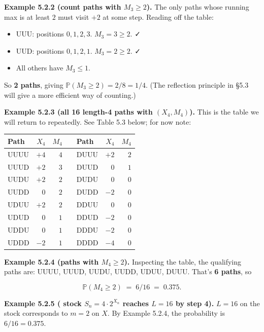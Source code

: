 \documentclass[
  10pt,
  twoside]{book}
\newcounter{none} %
\providecommand{\tightlist}{%
  \setlength{\itemsep}{0pt}\setlength{\parskip}{0pt}}
\begin{document}
\textbf{Example 5.2.2 (count paths with \(M_3 \ge 2\)).} The only paths
whose running max is at least \(2\) must visit \(+2\) at some step.
Reading off the table:

\begin{itemize}
\tightlist
\item
  UUU: positions \(0, 1, 2, 3\). \(M_3 = 3 \ge 2\). ✓
\item
  UUD: positions \(0, 1, 2, 1\). \(M_3 = 2 \ge 2\). ✓
\item
  All others have \(M_3 \le 1\).
\end{itemize}

So \textbf{2 paths}, giving \(\mathbb P(M_3 \ge 2) = 2/8 = 1/4\). (The
reflection principle in §5.3 will give a more efficient way of
counting.)

\textbf{Example 5.2.3 (all 16 length-4 paths with \((X_4, M_4)\)).} This
is the table we will return to repeatedly. See Table 5.3 below; for now
note:

{\def\LTcaptype{none} %
\begin{table}[H]
\centering
\begin{tabular}{|l|r|r|l|l|r|r|}
\toprule
Path & \(X_4\) & \(M_4\) & & Path & \(X_4\) & \(M_4\) \\
\midrule



UUUU & \(+4\) & \(4\) & & DUUU & \(+2\) & \(2\) \\
UUUD & \(+2\) & \(3\) & & DUUD & \(0\) & \(1\) \\
UUDU & \(+2\) & \(2\) & & DUDU & \(0\) & \(0\) \\
UUDD & \(0\) & \(2\) & & DUDD & \(-2\) & \(0\) \\
UDUU & \(+2\) & \(2\) & & DDUU & \(0\) & \(0\) \\
UDUD & \(0\) & \(1\) & & DDUD & \(-2\) & \(0\) \\
UDDU & \(0\) & \(1\) & & DDDU & \(-2\) & \(0\) \\
UDDD & \(-2\) & \(1\) & & DDDD & \(-4\) & \(0\) \\
\bottomrule
\end{tabular}
\end{table}
}

\textbf{Example 5.2.4 (paths with \(M_4 \ge 2\)).} Inspecting the table,
the qualifying paths are: UUUU, UUUD, UUDU, UUDD, UDUU, DUUU. That's
\textbf{6 paths}, so

\[\mathbb P(M_4 \ge 2) \;=\; 6/16 \;=\; 0.375.\]

\textbf{Example 5.2.5 ( stock \(S_n = 4 \cdot 2^{X_n}\) reaches
\(L = 16\) by step 4).} \(L = 16\) on the stock corresponds to \(m = 2\)
on \(X\). By Example 5.2.4, the probability is \(6/16 = 0.375\).
\end{document}
